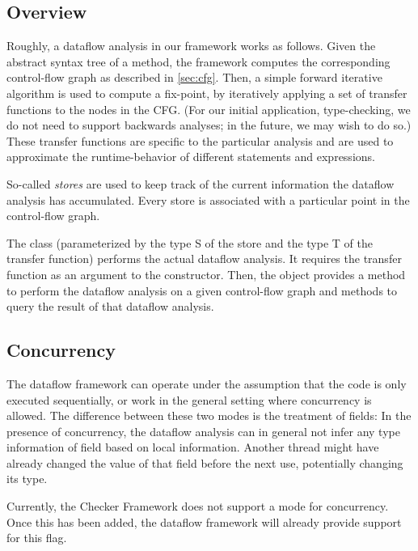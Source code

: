 \subsection{Overview}

Roughly, a dataflow analysis in our framework works as follows. Given the abstract syntax
tree of a method, the framework computes the corresponding control-flow graph as
described in \autoref{sec:cfg}. Then, a simple forward iterative algorithm is used to compute
a fix-point, by iteratively applying a set of transfer functions to the nodes in the
CFG\@.
(For our initial application, type-checking, we do not need to support
backwards analyses; in the future, we may wish to do so.)
 These transfer functions are specific to the particular analysis and are used
to approximate the runtime-behavior of different statements and expressions.

So-called \emph{stores} are used to keep track of the current information the dataflow
analysis has accumulated. Every store is associated with a particular point in the
control-flow graph.

The class  (parameterized by the type \code S of the store and the type \code T of the
transfer function) performs the actual dataflow analysis. It requires the transfer function
as an argument to the constructor. Then, the object provides a method to perform the dataflow
analysis on a given control-flow graph and methods to query the result of that dataflow analysis.





\subsection{Concurrency}

The dataflow framework can operate under the assumption that the code is only
executed sequentially, or work in the general setting where concurrency is allowed.
The difference between these two modes is the treatment of fields:  In the
presence of concurrency, the dataflow analysis can in general not infer any type information
of field based on local information.  Another thread might have already changed the value
of that field before the next use, potentially changing its type.

\begin{workinprogress}
    Currently, the Checker Framework does not support a mode for concurrency.  Once this
    has been added, the dataflow framework will already provide support for this flag.
\end{workinprogress}


